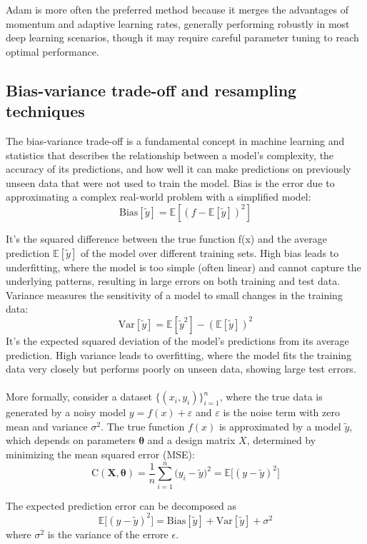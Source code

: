 \documentclass[
    article
 reprint,            %
 amsmath,amssymb,
 aps,
]{revtex4-2}
\begin{document}
Adam is more often the preferred method because it merges the advantages of momentum and adaptive learning rates, generally performing robustly in most deep learning scenarios, though it may require careful parameter tuning to reach optimal performance. \cite{goodfellow2016}




\subsection{Bias-variance trade-off and resampling techniques}

The bias-variance trade-off is a fundamental concept in machine learning and statistics that describes the relationship between a model's complexity, the accuracy of its predictions, and how well it can make predictions on previously unseen data that were not used to train the model\cite{hjorthjensen_week38}. 
Bias is the error due to approximating a complex real-world problem with a simplified model: 
$$\mathrm{Bias}[\tilde y]= \mathbb{E}[(f-\mathbb{E}[\tilde y])^2]$$

It's the squared difference between the true function f(x) and the average prediction $\mathbb{E}[\tilde y]$ of the model over different training sets. High bias leads to underfitting, where the model is too simple (often linear) and cannot capture the underlying patterns, resulting in large errors on both training and test data.
\\Variance measures the sensitivity of a model to small changes in the training data:
$$
\mathrm{Var}[\tilde y] = \mathbb{E}[\tilde y^2] - (\mathbb{E}[\tilde y])^2
$$
It's the expected squared deviation of the model's predictions from its average prediction.
High variance leads to overfitting, where the model fits the training data very closely but performs poorly on unseen data, showing large test errors.\\\\
More formally, consider a dataset $\{(x_i, y_i)\}_{i=1}^n$, where the true data is generated by a noisy model $y = f(x) + \varepsilon$ and $\varepsilon$ is the noise term with zero mean and variance $\sigma^2$. 
The true function $f(x)$ is approximated by a model $\tilde y$, which depends on parameters $\boldsymbol{\theta}$ and a design matrix $X$, determined by minimizing the mean squared error (MSE):
$$
\text{C}(\boldsymbol{X, \theta}) = \frac{1}{n} \sum_{i=1}^n \big( y_i - \tilde y \big)^2= \mathbb{E}\big[(y - \tilde y)^2\big]
$$

The expected prediction error can be decomposed as
$$\mathbb{E}[(y - \tilde y)^2\big] = \mathrm{Bias}[\tilde y] + \mathrm{Var}[\tilde y] + \sigma^2$$
where $\sigma ^2$ is the variance of the errore $\epsilon$. 
\end{document}
